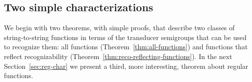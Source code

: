 




\subsection{Two simple characterizations}
We begin with two theorems, with simple proofs, that describe two classes of string-to-string functions in terms of the transducer semigroups that can be used to recognize them: all functions (Theorem~\ref{thm:all-functions}) and functions that reflect recognizability (Theorem~\ref{thm:reco-reflecting-functions}).
In the next Section~\ref{sec:reg-char} we present a third, more  interesting, theorem about  regular functions.

